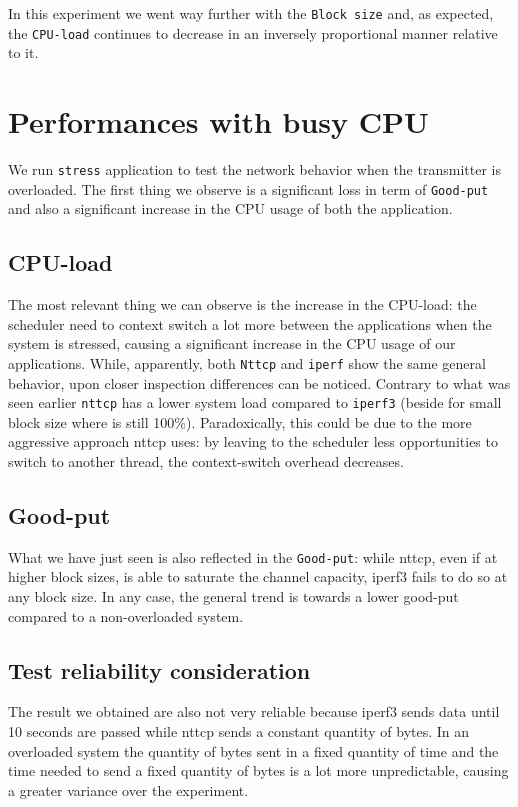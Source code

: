 \documentclass{exam}
\begin{document}
In this experiment we went way further with the \verb|Block size| and, as expected, the \verb|CPU-load| continues to decrease in an inversely proportional manner relative to it.

\section{Performances with busy CPU}
We run \verb|stress| application to test the network behavior when the transmitter is overloaded. The first thing we observe is a significant loss in term of \verb|Good-put| and also a significant increase in the CPU usage of both the application.

\subsection{CPU-load}
The most relevant thing we can observe is the increase in the CPU-load: the scheduler need to context switch a lot more between the applications when the system is stressed, causing a significant increase in the CPU usage of our applications.
While, apparently, both \verb|Nttcp| and \verb|iperf| show the same general behavior, upon closer inspection differences can be noticed. Contrary to what was seen earlier \texttt{nttcp} has a lower system load compared to \texttt{iperf3} (beside for small block size where is still 100\%). Paradoxically, this could be due to the more aggressive approach nttcp uses: by leaving to the scheduler less opportunities to switch to another thread, the context-switch overhead decreases.
\subsection{Good-put}
What we have just seen is also reflected in the \verb|Good-put|: while nttcp, even if at higher block sizes, is able to saturate the channel capacity, iperf3 fails to do so at any block size. In any case, the general trend is towards a lower good-put compared to a non-overloaded system.

\subsection{Test reliability consideration}
The result we obtained are also not very reliable because iperf3 sends data until 10 seconds are passed while nttcp sends a constant quantity of bytes. In an overloaded system the quantity of bytes sent in a fixed quantity of time and the time needed to send a fixed quantity of bytes is a lot more unpredictable, causing a greater variance over the experiment.
\end{document}
